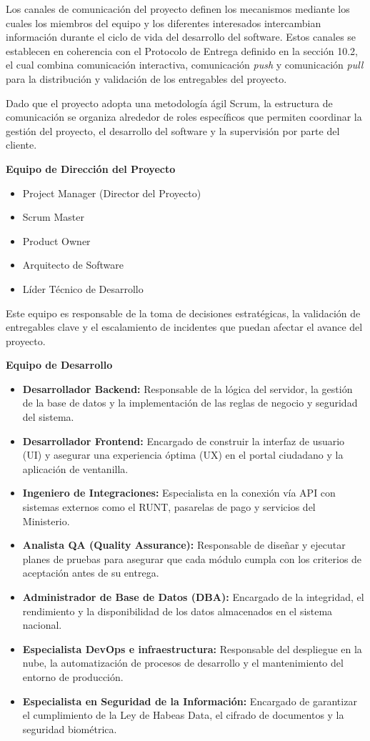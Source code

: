 Los canales de comunicación del proyecto definen los mecanismos mediante los cuales los miembros del equipo y los diferentes interesados intercambian información durante el ciclo de vida del desarrollo del software. Estos canales se establecen en coherencia con el Protocolo de Entrega definido en la sección 10.2, el cual combina comunicación interactiva, comunicación \textit{push} y comunicación \textit{pull} para la distribución y validación de los entregables del proyecto.

Dado que el proyecto adopta una metodología ágil Scrum, la estructura de comunicación se organiza alrededor de roles específicos que permiten coordinar la gestión del proyecto, el desarrollo del software y la supervisión por parte del cliente.

\textbf{Equipo de Dirección del Proyecto}

\begin{itemize}
\item Project Manager (Director del Proyecto)
\item Scrum Master
\item Product Owner
\item Arquitecto de Software
\item Líder Técnico de Desarrollo
\end{itemize}

Este equipo es responsable de la toma de decisiones estratégicas, la validación de entregables clave y el escalamiento de incidentes que puedan afectar el avance del proyecto.

\textbf{Equipo de Desarrollo}

\begin{itemize}
\item \textbf{Desarrollador Backend:} Responsable de la lógica del servidor, la gestión de la base de datos y la implementación de las reglas de negocio y seguridad del sistema.
\item \textbf{Desarrollador Frontend:} Encargado de construir la interfaz de usuario (UI) y asegurar una experiencia óptima (UX) en el portal ciudadano y la aplicación de ventanilla.
\item \textbf{Ingeniero de Integraciones:} Especialista en la conexión vía API con sistemas externos como el RUNT, pasarelas de pago y servicios del Ministerio.
\item \textbf{Analista QA (Quality Assurance):} Responsable de diseñar y ejecutar planes de pruebas para asegurar que cada módulo cumpla con los criterios de aceptación antes de su entrega.
\item \textbf{Administrador de Base de Datos (DBA):} Encargado de la integridad, el rendimiento y la disponibilidad de los datos almacenados en el sistema nacional.
\item \textbf{Especialista DevOps e infraestructura:} Responsable del despliegue en la nube, la automatización de procesos de desarrollo y el mantenimiento del entorno de producción.
\item \textbf{Especialista en Seguridad de la Información:} Encargado de garantizar el cumplimiento de la Ley de Habeas Data, el cifrado de documentos y la seguridad biométrica.
\end{itemize}

